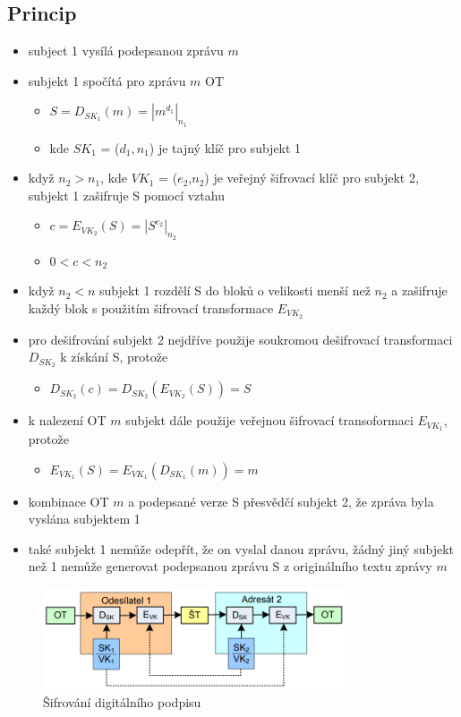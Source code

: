 \documentclass{szzclass}
\begin{document}
\subsection{Princip}
\begin{itemize}
    \item subject 1 vysílá podepsanou zprávu $m$
    \item subjekt 1 spočítá pro zprávu $m$ OT
    \begin{itemize}
        \item $S = D_{SK_1}(m) = |m^{d_1}|_{n_1}$
        \item kde $SK_1$ = ($d_1, n_1$) je tajný klíč pro subjekt 1
    \end{itemize}
    \item když $n_2 > n_1$, kde $VK_1$ = ($e_2$,$n_2$) je veřejný šifrovací klíč pro subjekt 2, subjekt 1 zašifruje S pomocí vztahu
    \begin{itemize}
        \item $c = E_{VK_2}(S) = |S^{e_2}|_{n_2}$
        \item $0 < c < n_2$
    \end{itemize}
    \item když $n_2 < n$ subjekt 1 rozdělí S do bloků o velikosti menší než $n_2$ a zašifruje každý blok s použitím šifrovací transformace $E_{VK_2}$
    \item pro dešifrování subjekt 2 nejdříve použije soukromou dešifrovací transformaci $D_{SK_2}$ k získání S, protože
    \begin{itemize}
        \item $D_{SK_2}(c) = D_{SK_2}(E_{VK_2}(S)) = S$
    \end{itemize}
    \item k nalezení OT $m$ subjekt dále použije veřejnou šifrovací transoformaci $E_{VK_1}$, protože
    \begin{itemize}
        \item $E_{VK_1}(S) = E_{VK_1}(D_{SK_1}(m)) = m$
    \end{itemize}
    \item kombinace OT $m$ a podepsané verze S přesvědčí subjekt 2, že zpráva byla vyslána subjektem 1
    \item také subjekt 1 nemůže odepřít, že on vyslal danou zprávu, žádný jiný subjekt než 1 nemůže generovat podepsanou zprávu S z originálního textu zprávy $m$
\end{itemize}
\begin{figure}[h!]
    \centering
    \includegraphics[width=0.8\textwidth]{topics/bi-spol-06/image/digitalSubscription.png}
    \caption{Šifrování digitálního podpisu}
\end{figure}
\end{document}
